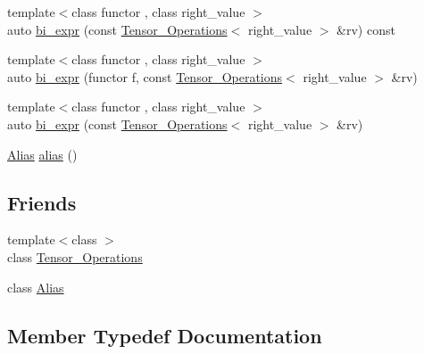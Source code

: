 \begin{DoxyCompactItemize}
\item 
{\footnotesize template$<$class functor , class right\+\_\+value $>$ }\\auto \hyperlink{structBC_1_1tensors_1_1Tensor__Operations_a239e16a212581c41686f16b99347e308}{bi\+\_\+expr} (const \hyperlink{structBC_1_1tensors_1_1Tensor__Operations}{Tensor\+\_\+\+Operations}$<$ right\+\_\+value $>$ \&rv) const 
\item 
{\footnotesize template$<$class functor , class right\+\_\+value $>$ }\\auto \hyperlink{structBC_1_1tensors_1_1Tensor__Operations_ac8700a097a7eaff4e771cf097e304232}{bi\+\_\+expr} (functor f, const \hyperlink{structBC_1_1tensors_1_1Tensor__Operations}{Tensor\+\_\+\+Operations}$<$ right\+\_\+value $>$ \&rv)
\item 
{\footnotesize template$<$class functor , class right\+\_\+value $>$ }\\auto \hyperlink{structBC_1_1tensors_1_1Tensor__Operations_aefd950bc45730a02e20208db86c095d7}{bi\+\_\+expr} (const \hyperlink{structBC_1_1tensors_1_1Tensor__Operations}{Tensor\+\_\+\+Operations}$<$ right\+\_\+value $>$ \&rv)
\item 
\hyperlink{structBC_1_1tensors_1_1Tensor__Operations_1_1Alias}{Alias} \hyperlink{structBC_1_1tensors_1_1Tensor__Operations_aba3d9dfbfa147dead2e62b279265cb43}{alias} ()
\end{DoxyCompactItemize}
\subsection*{Friends}
\begin{DoxyCompactItemize}
\item 
{\footnotesize template$<$class $>$ }\\class \hyperlink{structBC_1_1tensors_1_1Tensor__Operations_a4ad1710d63bfbaf82aa34422959ab998}{Tensor\+\_\+\+Operations}
\item 
class \hyperlink{structBC_1_1tensors_1_1Tensor__Operations_a79bc94ce849ece1b793fc22408e50fb8}{Alias}
\end{DoxyCompactItemize}


\subsection{Member Typedef Documentation}
